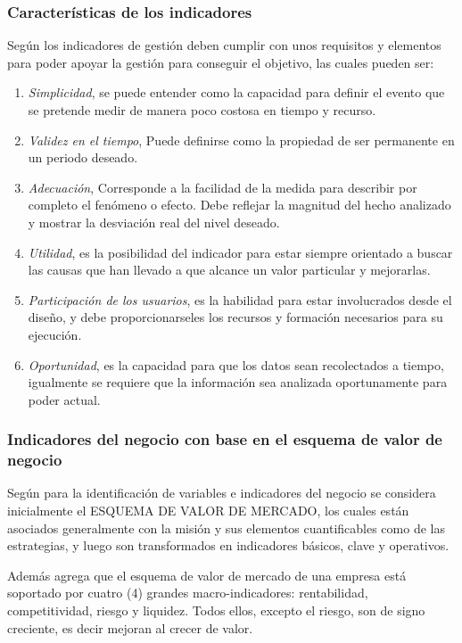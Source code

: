 \subsubsection{Características de los indicadores}
Según \cite{silva} los indicadores de gestión deben cumplir con unos requisitos
y elementos para poder apoyar la gestión para conseguir el objetivo, las cuales
pueden ser:
\begin{enumerate}
    \item \emph{Simplicidad}, se puede entender como la capacidad para definir el
          evento que se pretende medir de manera poco costosa en tiempo y recurso.
    \item \emph{Validez en el tiempo}, Puede definirse como la propiedad de ser
          permanente en un periodo deseado.
    \item \emph{Adecuación}, Corresponde a la facilidad de la medida para describir
          por completo el fenómeno o efecto. Debe reflejar la magnitud del hecho
          analizado y mostrar la desviación real del nivel deseado.
    \item \emph{Utilidad}, es la posibilidad del indicador para estar siempre
          orientado a buscar las causas que han llevado a que alcance un valor
          particular y mejorarlas.
    \item \emph{Participación de los usuarios}, es la habilidad para estar involucrados
          desde el diseño, y debe proporcionarseles los recursos y formación necesarios
          para su ejecución.
    \item \emph{Oportunidad}, es la capacidad para que los datos sean recolectados
          a tiempo, igualmente se requiere que la información sea analizada oportunamente
          para poder actual.
\end{enumerate}

\subsubsection{Indicadores del negocio con base en el esquema de valor de negocio}
Según \cite{cruz} para la identificación de variables e indicadores del negocio
se considera inicialmente el ESQUEMA DE VALOR DE MERCADO, los cuales están asociados
generalmente con la misión y sus elementos cuantificables como de las estrategias,
y luego son transformados en indicadores básicos, clave y operativos.

Además \cite{cruz} agrega que el esquema de valor de mercado de una empresa está
soportado por cuatro (4) grandes macro-indicadores: rentabilidad, competitividad,
riesgo y liquidez. Todos ellos, excepto el riesgo, son de signo creciente, es
decir mejoran al crecer de valor.

